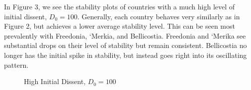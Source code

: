 \documentclass[12pt]{article}
\begin{document}
\begin{spacing}{1.5}

In Figure 3, we see the stability plots of countries with a much high level of initial dissent, $D_0=100$. Generally, each country behaves very similarly as in Figure 2, but achieves a lower average stability level. This can be seen most prevalently with Freedonia, `Merkia, and Bellicostia. Freedonia and `Merika see substantial drops on their level of stability but remain consistent. Bellicostia no longer has the initial spike in stability, but instead goes right into its oscillating pattern.   

\begin{figure}[htb]
\centering 
\caption{High Initial Dissent, $D_0=100$}
\end{figure}



\end{spacing}
\end{document}
